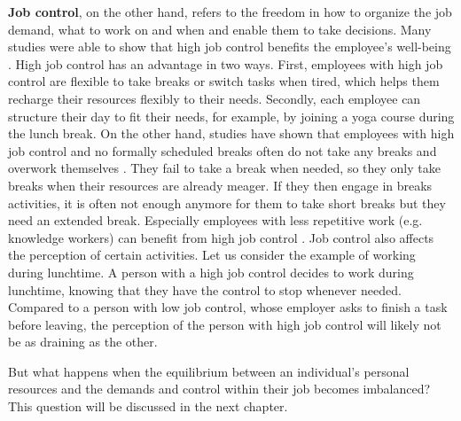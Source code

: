 \documentclass{hasel_thesis}
\begin{document}
\textbf{Job control}, on the other hand, refers to the freedom in how to organize the job demand, what to work on and when \cite{Trougakos.2009} and enable them to take decisions. Many studies were able to show that high job control benefits the employee's well-being \cite{Daniels.1994, Jackson.1983}. High job control has an advantage in two ways. First, employees with high job control are flexible to take breaks or switch tasks when tired, which helps them recharge their resources flexibly to their needs. Secondly, each employee can structure their day to fit their needs, for example, by joining a yoga course during the lunch break. 
On the other hand, studies have shown that employees with high job control and no formally scheduled breaks often do not take any breaks and overwork themselves \cite{McLean.2001}. They fail to take a break when needed, so they only take breaks when their resources are already meager. If they then engage in breaks activities, it is often not enough anymore for them to take short breaks but they need an extended break. Especially employees with less repetitive work (e.g. knowledge workers) can benefit from high job control \cite{Trougakos.2009}. Job control also affects the perception of certain activities. Let us consider the example of working during lunchtime. A person with a high job control decides to work during lunchtime, knowing that they have the control to stop whenever needed. Compared to a person with low job control, whose employer asks to finish a task before leaving, the perception of the person with high job control will likely not be as draining as the other.

But what happens when the equilibrium between an individual's personal resources and the demands and control within their job becomes imbalanced? This question will be discussed in the next chapter.
\end{document}
